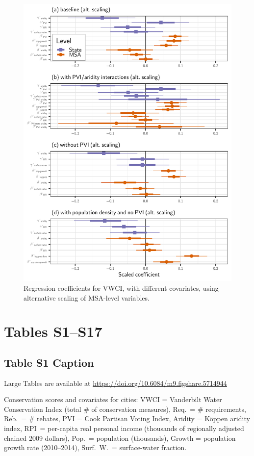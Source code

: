 \documentclass[draft]{agujournal}\usepackage{knitr}
\begin{document}
\begin{figure}
\includegraphics[width=6.25in]{figures_si/pooled_vwci_pvi_cat_plots-1} \caption[Regression coefficients for VWCI, with different covariates, using alternative scaling of MSA-level variables]{Regression coefficients for VWCI, with different covariates, using alternative scaling of MSA-level variables.}\label{fig:pooled_vwci_pvi_cat_plots}
\end{figure}



\clearpage
\section{Tables S1--S17}
\subsection*{Table S1 Caption}
\begin{table}[H]
\centering
Large Tables are available at \url{https://doi.org/10.6084/m9.figshare.5714944}
\caption{Conservation scores and covariates for  cities: VWCI = Vanderbilt Water Conservation Index (total \# of conservation measures), Req.\ = \# requirements, Reb.\ = \# rebates, PVI = Cook Partisan Voting Index, Aridity = K\"oppen aridity index, RPI\ = per-capita real personal income (thousands of regionally adjusted chained 2009 dollars), Pop.\ = population (thousands), Growth = population growth rate (2010--2014), Surf.\ W.\ = surface-water fraction.}
\label{tab:vwci}
\end{table}
\end{document}

